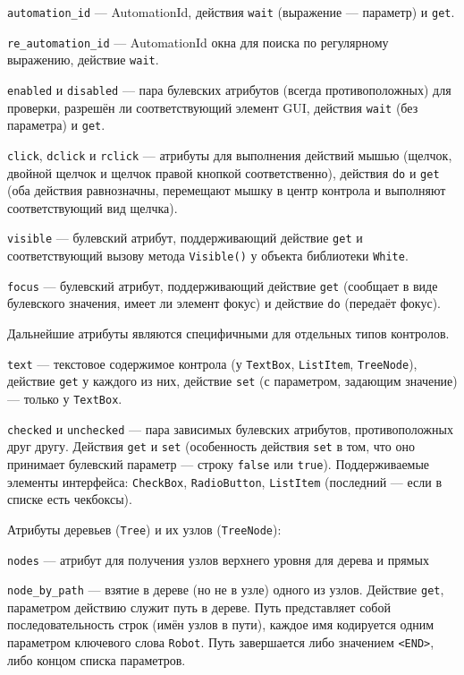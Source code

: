 \documentclass[11pt]{book} %
\begin{document}
\verb'automation_id' --- AutomationId, действия \verb|wait| (выражение --- параметр) и \verb|get|.

\verb're_automation_id' --- AutomationId окна для поиска по регулярному выражению, действие \verb|wait|.

\verb'enabled' и \verb'disabled' --- пара булевских атрибутов (всегда противоположных) для проверки, разрешён ли соответствующий элемент GUI, действия \verb|wait| (без параметра) и \verb|get|.

\verb'click', \verb'dclick' и \verb|rclick| --- атрибуты для выполнения действий мышью (щелчок, двойной щелчок и щелчок правой кнопкой соответственно), действия \verb|do| и \verb|get| (оба действия равнозначны, перемещают мышку в центр контрола и выполняют соответствующий вид щелчка).

\verb|visible| --- булевский атрибут, поддерживающий действие \verb|get| и соответствующий вызову метода \verb|Visible()| у объекта библиотеки \verb|White|.

\verb|focus| --- булевский атрибут, поддерживающий действие \verb|get| (сообщает в виде булевского значения, имеет ли элемент фокус) и действие \verb|do| (передаёт фокус).

Дальнейшие атрибуты являются специфичными для отдельных типов контролов.

\verb|text| --- текстовое содержимое контрола (у \verb|TextBox|, \verb|ListItem|, \verb|TreeNode|), действие \verb|get| у каждого из них, действие \verb|set| (с параметром, задающим значение) --- только у \verb|TextBox|.


\verb|checked| и \verb|unchecked| --- пара зависимых булевских атрибутов, противоположных друг другу. Действия \verb|get| и \verb|set| (особенность действия \verb|set| в том, что оно принимает булевский параметр --- строку \verb|false| или \verb|true|). Поддерживаемые элементы интерфейса: \verb|CheckBox|, \verb|RadioButton|, \verb|ListItem| (последний --- если в списке есть чекбоксы).

Атрибуты деревьев (\verb|Tree|) и их узлов (\verb|TreeNode|):

\verb|nodes| --- атрибут для получения узлов верхнего уровня для дерева и прямых 

\verb|node_by_path| --- взятие в дереве (но не в узле) одного из узлов. Действие \verb|get|, параметром действию служит путь в дереве. Путь представляет собой последовательность строк (имён узлов в пути), каждое имя кодируется одним параметром ключевого слова \verb|Robot|. Путь завершается либо значением \verb|<END>|, либо концом списка параметров.
\end{document}
